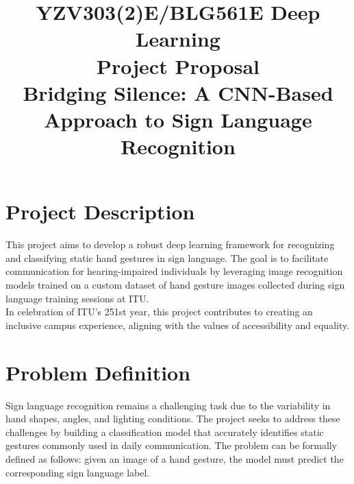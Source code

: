 \documentclass[conference]{IEEEtran}
\begin{document}
\title{
YZV303(2)E/BLG561E  Deep Learning \\ 
Project Proposal\\
Bridging Silence: A CNN-Based Approach to Sign Language Recognition
}

\author{
\and
{}
}

\maketitle
\vspace{-1cm}

\section{Project Description}
This project aims to develop a robust deep learning framework for recognizing and classifying static hand gestures in sign language. The goal is to facilitate communication for hearing-impaired individuals by leveraging image recognition models trained on a custom dataset of hand gesture images collected during sign language training sessions at ITU.\\
In celebration of ITU's 251st year, this project contributes to creating an inclusive campus experience, aligning with the values of accessibility and equality.


\section{Problem Definition}
Sign language recognition remains a challenging task due to the variability in hand shapes, angles, and lighting conditions. The project seeks to address these challenges by building a classification model that accurately identifies static gestures commonly used in daily communication. The problem can be formally defined as follows: given an image of a hand gesture, the model must predict the corresponding sign language label.
\end{document}
